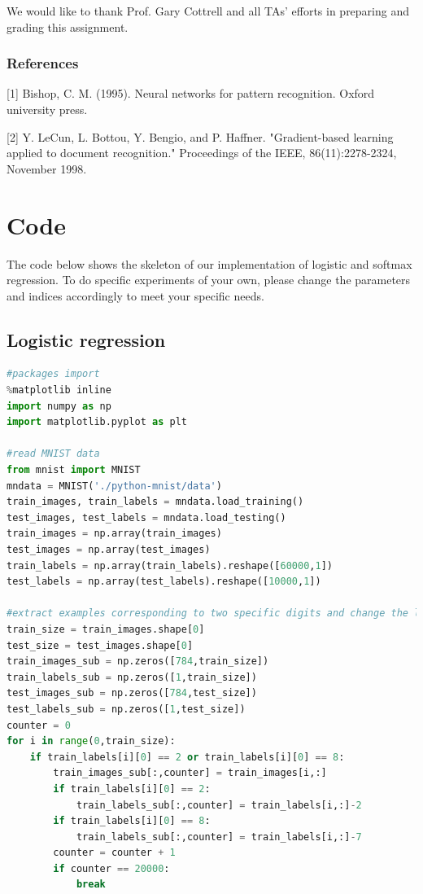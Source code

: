 \documentclass{article} %
\begin{document}
We would like to thank Prof. Gary Cottrell and all TAs' efforts in preparing and grading this assignment.

\subsubsection*{References}

\small{
[1] Bishop, C. M. (1995). Neural networks for pattern recognition. Oxford university press.

[2] Y. LeCun, L. Bottou, Y. Bengio, and P. Haffner. "Gradient-based learning applied to document recognition." Proceedings of the IEEE, 86(11):2278-2324, November 1998.

\section{Code}
The code below shows the skeleton of our implementation of logistic and softmax regression. To do specific experiments of your own, please change the parameters and indices accordingly to meet your specific needs.

\subsection{Logistic regression}
\begin{lstlisting}[language=Python]
#packages import
%matplotlib inline
import numpy as np
import matplotlib.pyplot as plt

#read MNIST data
from mnist import MNIST
mndata = MNIST('./python-mnist/data')
train_images, train_labels = mndata.load_training()
test_images, test_labels = mndata.load_testing()
train_images = np.array(train_images)
test_images = np.array(test_images)
train_labels = np.array(train_labels).reshape([60000,1])
test_labels = np.array(test_labels).reshape([10000,1])

#extract examples corresponding to two specific digits and change the labels to 0 and 1
train_size = train_images.shape[0]
test_size = test_images.shape[0]
train_images_sub = np.zeros([784,train_size])
train_labels_sub = np.zeros([1,train_size])
test_images_sub = np.zeros([784,test_size])
test_labels_sub = np.zeros([1,test_size])
counter = 0
for i in range(0,train_size):
    if train_labels[i][0] == 2 or train_labels[i][0] == 8:
        train_images_sub[:,counter] = train_images[i,:]
        if train_labels[i][0] == 2:
            train_labels_sub[:,counter] = train_labels[i,:]-2
        if train_labels[i][0] == 8:
            train_labels_sub[:,counter] = train_labels[i,:]-7
        counter = counter + 1
        if counter == 20000:
            break
        

\end{lstlisting}}
\end{document}
